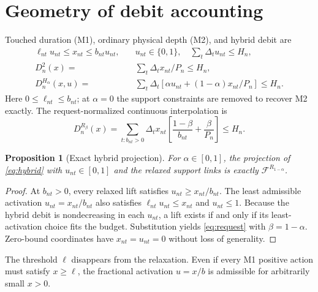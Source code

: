 \documentclass[11pt]{article}
\newtheorem{proposition}{Proposition}
\newcommand{\F}{\mathcal F}
\begin{document}
\section{Geometry of debit accounting}
Touched duration (M1), ordinary physical depth (M2), and hybrid debit are
\begin{align}
 \ell_{nt}u_{nt}\leq x_{nt}\leq b_{nt}u_{nt},\quad&u_{nt}\in\{0,1\},\quad\sum_t\Delta_tu_{nt}\leq H_n,\label{eq:support}\\
 D_n^2(x)=&\sum_t\Delta_t x_{nt}/P_n\leq H_n,\label{eq:m2}\\
 D_n^{H_\alpha}(x,u)=&\sum_t\Delta_t[\alpha u_{nt}+(1-\alpha)x_{nt}/P_n]\leq H_n.\label{eq:hybrid}
\end{align}
Here $0\leq\ell_{nt}\leq b_{nt}$; at $\alpha=0$ the support constraints are removed to recover M2 exactly. The request-normalized continuous interpolation is
\begin{equation}
 D_n^{R_\beta}(x)=\sum_{t:b_{nt}>0}\Delta_tx_{nt}\left[\frac{1-\beta}{b_{nt}}+\frac{\beta}{P_n}\right]\leq H_n.
 \label{eq:request}
\end{equation}
\begin{proposition}[Exact hybrid projection]
For $\alpha\in[0,1]$, the projection of \eqref{eq:hybrid} with $u_{nt}\in[0,1]$ and the relaxed support links is exactly $\F^{R_{1-\alpha}}$.
\end{proposition}
\begin{proof}
At $b_{nt}>0$, every relaxed lift satisfies $u_{nt}\geq x_{nt}/b_{nt}$. The least admissible activation $u_{nt}=x_{nt}/b_{nt}$ also satisfies $\ell_{nt}u_{nt}\leq x_{nt}$ and $u_{nt}\leq1$. Because the hybrid debit is nondecreasing in each $u_{nt}$, a lift exists if and only if its least-activation choice fits the budget. Substitution yields \eqref{eq:request} with $\beta=1-\alpha$. Zero-bound coordinates have $x_{nt}=u_{nt}=0$ without loss of generality.
\end{proof}
The threshold $\ell$ disappears from the relaxation. Even if every M1 positive action must satisfy $x\geq\ell$, the fractional activation $u=x/b$ is admissible for arbitrarily small $x>0$.
\end{document}

